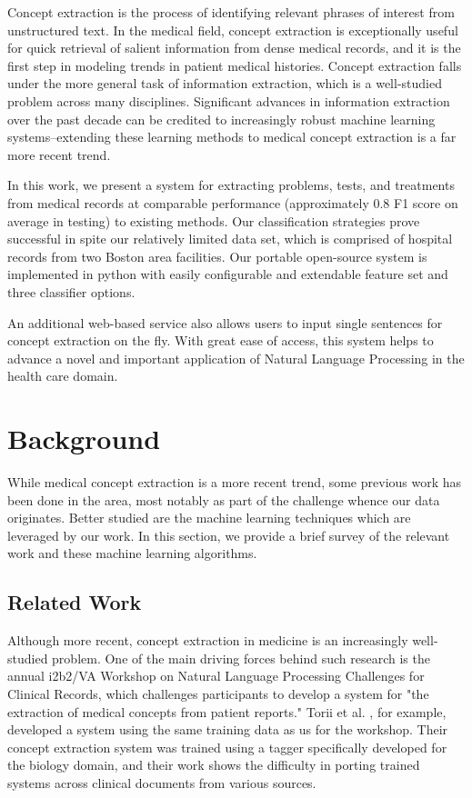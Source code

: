 \documentclass[preprint]{style}
\begin{document}
Concept extraction is the process of identifying relevant phrases of interest from unstructured text. In the medical field, concept extraction is exceptionally useful for quick retrieval of salient information from dense medical records, and it is the first step in modeling trends in patient medical histories. Concept extraction falls under the more general task of information extraction, which is a well-studied problem across many disciplines. Significant advances in information extraction over the past decade can be credited to increasingly robust machine learning systems--extending these learning methods to medical concept extraction is a far more recent trend. 

In this work, we present a system for extracting problems, tests, and treatments from medical records at comparable performance (approximately 0.8 F1 score on average in testing) to existing methods. Our classification strategies prove successful in spite our relatively limited data set, which is comprised of hospital records from two Boston area facilities. Our portable open-source system is implemented in python with easily configurable and extendable feature set and three classifier options. 

An additional web-based service also allows users to input single sentences for concept extraction on the fly. With great ease of access, this system helps to advance a novel and important application of Natural Language Processing in the health care domain.  


\section{Background}
While medical concept extraction is a more recent trend, some previous work has been done in the area, most notably as part of the challenge whence our data originates. Better studied are the machine learning techniques which are leveraged by our work. In this section, we provide a brief survey of the relevant work and these machine learning algorithms.

\subsection{Related Work}
Although more recent, concept extraction in medicine is an increasingly well-studied problem. One of the main driving forces behind such research is the annual i2b2/VA Workshop on Natural Language Processing Challenges for Clinical Records, which challenges participants to develop a system for "the extraction of medical concepts from patient reports." Torii et al. \cite{torii}, for example, developed a system using the same training data as us for the workshop. Their concept extraction system was trained using a tagger specifically developed for the biology domain, and their work shows the difficulty in porting trained systems across clinical documents from various sources. 
\end{document}
